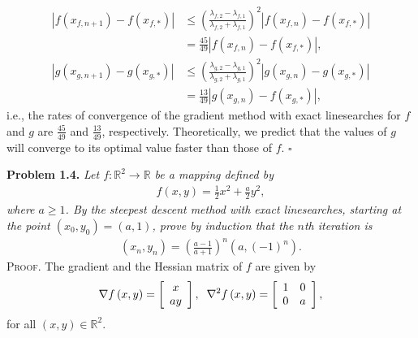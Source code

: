 \documentclass[a4paper]{article}
\numberwithin{equation}{section}
\begin{document}
\begin{enumerate}
\begin{align}
\left| {f\left( {{x_{f,n + 1}}} \right) - f\left( {{x_{f,*}}} \right)} \right| &\le {\left( {\frac{{{\lambda _{f,2}} - {\lambda _{f,1}}}}{{{\lambda _{f,2}} + {\lambda _{f,1}}}}} \right)^2}\left| {f\left( {{x_{f,n}}} \right) - f\left( {{x_{f,*}}} \right)} \right|\\
& = \frac{{45}}{{49}}\left| {f\left( {{x_{f,n}}} \right) - f\left( {{x_{f,*}}} \right)} \right|,\\
\left| {g\left( {{x_{g,n + 1}}} \right) - g\left( {{x_{g,*}}} \right)} \right| &\le {\left( {\frac{{{\lambda _{g,2}} - {\lambda _{g,1}}}}{{{\lambda _{g,2}} + {\lambda _{g,1}}}}} \right)^2}\left| {g\left( {{x_{g,n}}} \right) - g\left( {{x_{g,*}}} \right)} \right|\\
& = \frac{{13}}{{49}}\left| {g\left( {{x_{g,n}}} \right) - f\left( {{x_{g,*}}} \right)} \right|,
\end{align}
i.e., the rates of convergence of the gradient method with exact linesearches for $f$ and $g$ are $\frac{45}{49}$ and $\frac{13}{49}$, respectively. Theoretically, we predict that the values of $g$ will converge to its optimal value faster than those of $f$. \hfill $\square$
\end{enumerate}
\textbf{Problem 1.4.} \textit{Let $f:\mathbb{R}^2\to \mathbb{R}$ be a mapping defined by}
\begin{align}
f\left( {x,y} \right) = \frac{1}{2}{x^2} + \frac{a}{2}{y^2},
\end{align}
\textit{where $a\ge 1$. By the steepest descent method with exact linesearches, starting at the point $\left(x_0,y_0\right)=\left(a,1\right)$, prove by induction that the $n$th iteration is}
\begin{align}
\label{1.29}
\left( {{x_n},{y_n}} \right) = {\left( {\frac{{a - 1}}{{a + 1}}} \right)^n}\left( {a,{{\left( { - 1} \right)}^n}} \right).
\end{align}
\textsc{Proof.} The gradient and the Hessian matrix of $f$ are given by
\begin{align}
\nabla f\left( {x,y} \right) = \left[ {\begin{array}{*{20}{c}}
x\\
{ay}
\end{array}} \right],\hspace{0.2cm} {\nabla ^2}f\left( {x,y} \right) = \left[ {\begin{array}{*{20}{c}}
1&0\\
0&a
\end{array}} \right],
\end{align}
for all $\left(x,y\right)\in \mathbb{R}^2$. 
\end{document}
